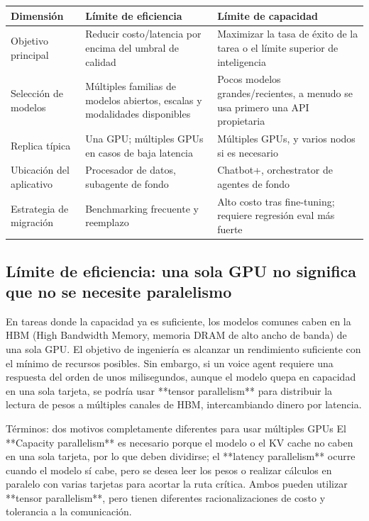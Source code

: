 \begin{center}
\small
\begin{tabularx}{\textwidth}{L{3cm}YY}
\toprule
Dimensión & Límite de eficiencia & Límite de capacidad \\
\midrule
Objetivo principal & Reducir costo/latencia por encima del umbral de calidad & Maximizar la tasa de éxito de la tarea o el límite superior de inteligencia \\
Selección de modelos & Múltiples familias de modelos abiertos, escalas y modalidades disponibles & Pocos modelos grandes/recientes, a menudo se usa primero una API propietaria \\
Replica típica & Una GPU; múltiples GPUs en casos de baja latencia & Múltiples GPUs, y varios nodos si es necesario \\
Ubicación del aplicativo & Procesador de datos, subagente de fondo & Chatbot+, orchestrator de agentes de fondo \\
Estrategia de migración & Benchmarking frecuente y reemplazo & Alto costo tras fine-tuning; requiere regresión eval más fuerte \\
\bottomrule
\end{tabularx}
\end{center}

\subsection{Límite de eficiencia: una sola GPU no significa que no se necesite paralelismo}

En tareas donde la capacidad ya es suficiente, los modelos comunes caben en la HBM (High Bandwidth Memory, memoria DRAM de alto ancho de banda) de una sola GPU. El objetivo de ingeniería es alcanzar un rendimiento suficiente con el mínimo de recursos posibles. Sin embargo, si un voice agent requiere una respuesta del orden de unos milisegundos, aunque el modelo quepa en capacidad en una sola tarjeta, se podría usar **tensor parallelism** para distribuir la lectura de pesos a múltiples canales de HBM, intercambiando dinero por latencia.


\begin{knowledgebox}{Términos: dos motivos completamente diferentes para usar múltiples GPUs}
El **Capacity parallelism** es necesario porque el modelo o el KV cache no caben en una sola tarjeta, por lo que deben dividirse; el **latency parallelism** ocurre cuando el modelo sí cabe, pero se desea leer los pesos o realizar cálculos en paralelo con varias tarjetas para acortar la ruta crítica. Ambos pueden utilizar **tensor parallelism**, pero tienen diferentes racionalizaciones de costo y tolerancia a la comunicación.
\end{knowledgebox}

